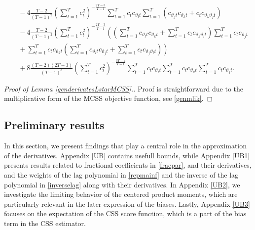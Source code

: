 {{\begin{lemma}
\begin{align*}
    &\ \ \  - 4\frac{T-2}{(T-1)^2}  \left( \sum_{t = 1}^T c_t^2  \right)^{-\frac{2T-3}{T-1}}  \sum_{t = 1}^T c_t c_{\vartheta_l  t} \sum_{t = 1}^T \left( c_{\vartheta_j t}  c_{\vartheta_k t} + c_t  c_{\vartheta_k \vartheta_j  t}  \right) \\
    &\ \ \ - 4\frac{T-2}{(T-1)^2}  \left( \sum_{t = 1}^T c_t^2 \right)^{-\frac{2T-3}{T-1}} \left(\left( \sum_{t = 1}^T  c_{\vartheta_l t}  c_{\vartheta_k t} + \sum_{t = 1}^T  c_t  c_{\vartheta_k \vartheta_l t} \right) \sum_{t = 1}^T  c_t  c_{\vartheta_j t}  \right.\\ 
    &\left.\ \ \ +  \sum_{t = 1}^T  c_t  c_{\vartheta_k t} \left( \sum_{t = 1}^T  c_{\vartheta_l t}  c_{\vartheta_j t} + \sum_{t = 1}^T  c_t  c_{\vartheta_j \vartheta_l t}  \right) \right) \\
     &\ \ \ + 8\frac{(T-2)(2T-3)}{(T-1)^3}  \left( \sum_{t = 1}^T c_t^2 \right)^{-\frac{3T-4}{T-1}}  \sum_{t = 1}^T c_t c_{\vartheta_l t} \sum_{t = 1}^T  c_t  c_{\vartheta_k t} \sum_{t = 1}^T  c_t  c_{\vartheta_j t}.
\end{align*}
\end{lemma}
\begin{proof}[Proof of Lemma \ref{genderivatesLstarMCSS}.]
Proof is straightforward due to the multiplicative form of the MCSS objective function, see \eqref{genmlik}.
\end{proof}








\subsection{Preliminary results} \label{genlemmaap}

In this section, we present findings that play a central role in the approximation of the derivatives. Appendix \ref{UB} contains usefull bounds, while Appendix \ref{UB1} presents results related to fractional coefficients in \eqref{fracpar}, and their derivatives, and the weights of the lag polynomial in \eqref{repmainf} and the inverse of the lag polynomial in \eqref{inverselag} along with their derivatives. In Appendix \ref{UB2}, we investigate the limiting behavior of the centered product moments, which are particularly relevant in the later expression of the biases. Lastly, Appendix \ref{UB3} focuses on the expectation of the CSS score function, which is a part of the bias term in the CSS estimator.



}}
